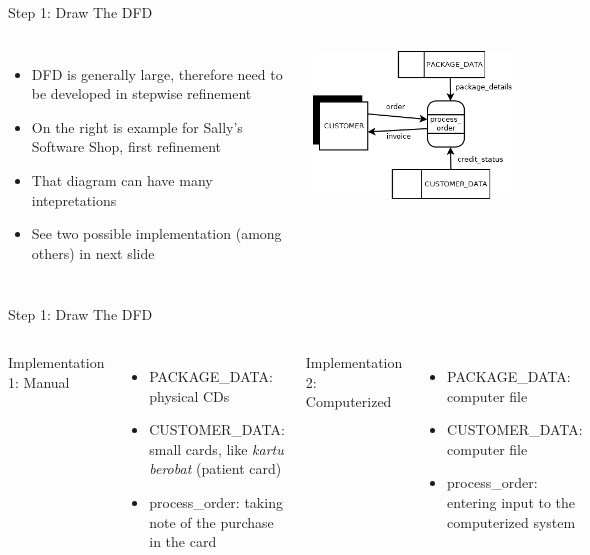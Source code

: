 \documentclass{beamer}
\begin{document}
	\begin{frame}{Step 1: Draw The DFD}
		\begin{columns}[t,totalwidth=\textwidth]
				\begin{itemize}
					\item DFD is generally large, therefore need to be developed in stepwise refinement
					\item On the right is example for Sally's Software Shop, first refinement
					\item That diagram can have many intepretations
					\item See two possible implementation (among others) in next slide
				\end{itemize}			
				\begin{flushright}
					\includegraphics[scale=0.5]{img/01_sally_dfd_first_refinement}
				\end{flushright}
		\end{columns}		
	\end{frame}
	\begin{frame}{Step 1: Draw The DFD}
		\begin{columns}[t,totalwidth=\textwidth]
				Implementation 1: Manual
				\begin{itemize}
					\item PACKAGE\_DATA: physical CDs
					\item CUSTOMER\_DATA: small cards, like \textit{kartu berobat} (patient card)
					\item process\_order: taking note of the purchase in the card
				\end{itemize}
				Implementation 2: Computerized
					\begin{itemize}
						\item PACKAGE\_DATA: computer file
						\item CUSTOMER\_DATA: computer file
						\item process\_order: entering input to the computerized system
					\end{itemize}
		\end{columns}
	\end{frame}
\end{document}
